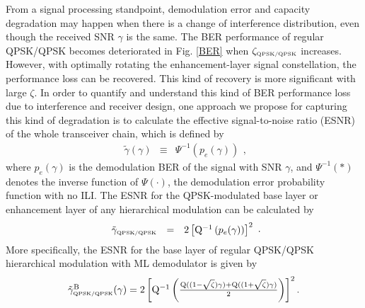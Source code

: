 \documentclass[conference]{IEEEtran}
\begin{document}
From a signal processing standpoint, demodulation error and
capacity degradation may happen when there is a change of
interference distribution, even though the received SNR $\gamma$
is the same. The BER performance of regular QPSK/QPSK becomes
deteriorated in Fig. \ref{BER} when $\zeta_{\mbox{\tiny
QPSK/QPSK}}$ increases. However, with optimally rotating the
enhancement-layer signal constellation, the performance loss can
be recovered. This kind of recovery is more significant with large
$\zeta$. In order to quantify and understand this kind of BER
performance loss due to interference and receiver design, one
approach we propose for capturing this kind of degradation is to
calculate the effective signal-to-noise ratio (ESNR) of the whole
transceiver chain, which is defined by
\begin{equation}
\begin{array}{rcl}
\tilde{\gamma}\left(\gamma\right)&\equiv&\Psi^{-1}\left(p_{e}(\gamma)\right)
\end{array},\label{eff_SNR}
\end{equation}
\noindent where $p_{e}(\gamma)$ is the demodulation BER of the
signal with SNR $\gamma$, and $\Psi^{-1}\left(\ast\right)$ denotes
the inverse function of $\Psi\left(\cdot\right)$, the demodulation
error probability function with no ILI. The ESNR for the
QPSK-modulated base layer or enhancement layer of any hierarchical
modulation can be calculated by
\begin{equation}
\begin{array}{rcl}
\tilde{\gamma}_{\mbox{\tiny QPSK/QPSK}}&=&2\left[{\rm
Q}^{-1}\left(p_{e}(\gamma)\right)\right]^2
\end{array}.\label{eff_SNR_QPSK}
\end{equation}
\noindent More specifically, the ESNR for the base layer of
regular QPSK/QPSK hierarchical modulation with ML demodulator is
given by
\begin{equation}\hspace{-0.00in}
\begin{array}{l}
\tilde{\gamma}_{\mbox{\tiny QPSK/QPSK}}^{\rm
B}(\gamma)=2\left[{\rm Q}^{-1}\left(\frac{{\rm
Q}((1-\sqrt{\zeta})\gamma)+{\rm
Q}((1+\sqrt{\zeta})\gamma)}{2}\right)\right]^2.
\end{array}\label{eff_SNR_QPSK_QPSK}
\end{equation}
\end{document}
